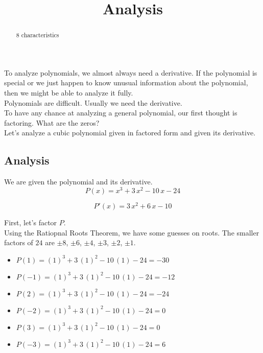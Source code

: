\documentclass{ximera}
\title{Analysis}
\begin{document}
\begin{abstract}
8 characteristics
\end{abstract}
\maketitle



To analyze polynomials, we almost always need a derivative.  If the polynomial is special or we just happen to know unusual information about the polynomial, then we might be able to analyze it fully. \\

Polynomials are difficult. Usually we need the derivative. \\

To have any chance at analyzing a general polynomial, our first thought is factoring. What are the zeros? \\


Let's analyze a cubic polynomial given in factored form and given its derivative. \\


\subsection*{Analysis}


We are given the polynomial and its derivative. \\


\[
P(x) = x^3 + 3 \, x^2 - 10 \, x - 24
\]


\[
P'(x) = 3 \, x^2 + 6 \, x - 10
\]



First, let's factor $P$. \\

Using the Ratiopnal Roots Theorem, we have some guesses on roots.  The smaller factors of $24$ are $\pm8$, $\pm6$, $\pm4$, $\pm3$, $\pm2$, $\pm1$.  



\begin{itemize}
	\item $P(1) = (1)^3 + 3 \, (1)^2 - 10 \, (1) - 24 = -30$
	\item $P(-1) = (1)^3 + 3 \, (1)^2 - 10 \, (1) - 24 = -12$
	\item $P(2) = (1)^3 + 3 \, (1)^2 - 10 \, (1) - 24 = -24$
	\item $P(-2) = (1)^3 + 3 \, (1)^2 - 10 \, (1) - 24 = 0$
	\item $P(3) = (1)^3 + 3 \, (1)^2 - 10 \, (1) - 24 = 0$
	\item $P(-3) = (1)^3 + 3 \, (1)^2 - 10 \, (1) - 24 = 6$
\end{itemize}
\end{document}

